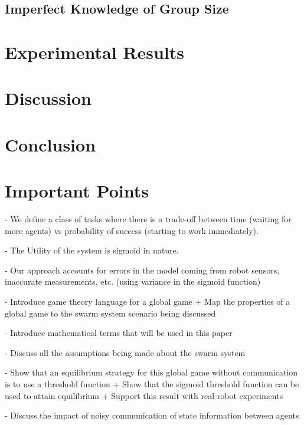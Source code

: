 \documentclass[conference]{IEEETran}
\begin{document}
\subsection{Imperfect Knowledge of Group Size}




\section{Experimental Results}




\section{Discussion}




\section{Conclusion}



\section{Important Points}
- We define a class of tasks where there is a trade-off between time (waiting for more agents) vs probability of success (starting to work immediately).

- The Utility of the system is sigmoid in nature.

- Our approach accounts for errors in the model coming from robot sensors, inaccurate measurements, etc. (using variance in the sigmoid function)

- Introduce game theory language for a global game
  + Map the properties of a global game to the swarm system scenario being discussed

- Introduce mathematical terms that will be used in this paper

- Discuss all the assumptions being made about the swarm system

- Show that an equilibrium strategy for this global game without communication is to use a threshold function
  + Show that the sigmoid threshold function can be used to attain equilibrium
  + Support this result with real-robot experiments
  
- Discuss the impact of noisy communication of state information between agents  


\end{document}
